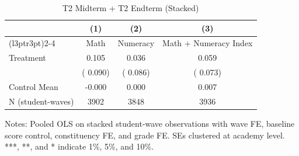 \begin{table}[!htbp]
\centering
\caption{T2 Midterm + T2 Endterm (Stacked)}
\label{tab:ng_t2_over_time}
\begin{threeparttable}
\begin{tabular}[t]{lccc}
\toprule
 & (1) & (2) & (3) \\
\cmidrule(l{3pt}r{3pt}){2-4}
 & Math & Numeracy & Math + Numeracy Index \\
\midrule
Treatment &   0.105 &   0.036 &   0.059 \\
 & (  0.090) & (  0.086) & (  0.073) \\
\addlinespace
Control Mean &  -0.000 &   0.000 &   0.007 \\
N (student-waves) & 3902 & 3848 & 3936 \\
\bottomrule
\end{tabular}
\begin{tablenotes}[para]
\item Notes: Pooled OLS on stacked student-wave observations with wave FE, 
baseline score control, constituency FE, and grade FE. 
SEs clustered at academy level. ***, **, and * indicate 1\%, 5\%, and 10\%.
\end{tablenotes}
\end{threeparttable}
\end{table}
